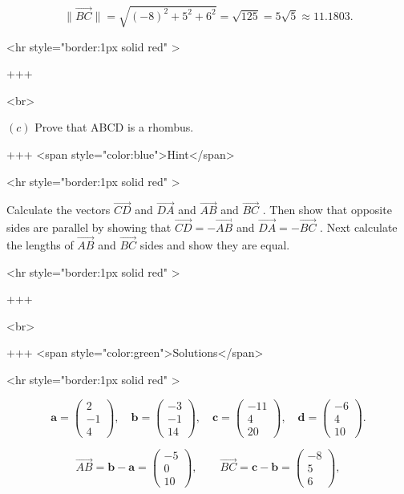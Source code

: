 $$
\lVert \overrightarrow{BC}\rVert
= \sqrt{(-8)^2+5^2+6^2}
= \sqrt{125}
= 5\sqrt{5}
\approx 11.1803.
$$

<hr style="border:1px solid red" >

+++

<br>

\((c)\) Prove that ABCD is a rhombus.

+++ <span style="color:blue">Hint</span>

<hr style="border:1px solid red" >

Calculate the vectors \(\overrightarrow{CD}\) and \(\overrightarrow{DA}\) and \(\overrightarrow{AB}\) and \(\overrightarrow{BC}\) . Then show that opposite sides are parallel by showing that \(\overrightarrow{CD}=-\overrightarrow{AB}\) and \(\overrightarrow{DA}=-\overrightarrow{BC}\) . Next calculate the lengths of \(\overrightarrow{AB}\) and \(\overrightarrow{{BC}}\) sides and show they are equal.

<hr style="border:1px solid red" >

+++

<br>

+++ <span style="color:green">Solutions</span>

<hr style="border:1px solid red" >

$$
\mathbf{a}=\left(\begin{array}{c}2\\-1\\4\end{array}\right),\quad
\mathbf{b}=\left(\begin{array}{c}-3\\-1\\14\end{array}\right),\quad
\mathbf{c}=\left(\begin{array}{c}-11\\4\\20\end{array}\right),\quad
\mathbf{d}=\left(\begin{array}{c}-6\\4\\10\end{array}\right).
$$

$$
\overrightarrow{AB}=\mathbf{b}-\mathbf{a}=\left(\begin{array}{c}-5\\0\\10\end{array}\right),\qquad
\overrightarrow{BC}=\mathbf{c}-\mathbf{b}=\left(\begin{array}{c}-8\\5\\6\end{array}\right),
$$

